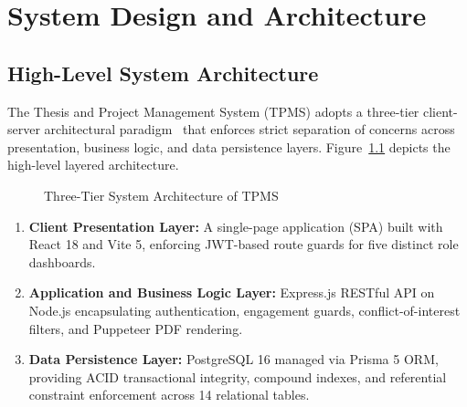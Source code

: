 \chapter{System Design and Architecture}

\section{High-Level System Architecture}
The Thesis and Project Management System (TPMS) adopts a three-tier client-server architectural paradigm~\citep{martin2017clean} that enforces strict separation of concerns across presentation, business logic, and data persistence layers. Figure~\ref{fig:system_arch} depicts the high-level layered architecture.

\begin{figure}[H]
\centering
{}
\caption{Three-Tier System Architecture of TPMS}
\label{fig:system_arch}
\end{figure}

\begin{enumerate}
    \item \textbf{Client Presentation Layer:} A single-page application (SPA) built with React 18 and Vite 5, enforcing JWT-based route guards for five distinct role dashboards.
    \item \textbf{Application and Business Logic Layer:} Express.js RESTful API on Node.js encapsulating authentication, engagement guards, conflict-of-interest filters, and Puppeteer PDF rendering.
    \item \textbf{Data Persistence Layer:} PostgreSQL 16 managed via Prisma 5 ORM, providing ACID transactional integrity, compound indexes, and referential constraint enforcement across 14 relational tables.
\end{enumerate}

